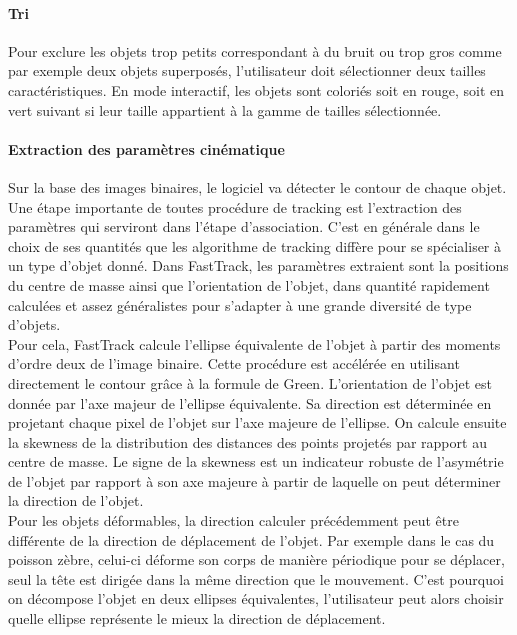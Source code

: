 		
		\paragraph{Tri}
		Pour exclure les objets trop petits correspondant à du bruit ou trop gros comme par exemple deux objets superposés, l’utilisateur doit sélectionner deux tailles caractéristiques. En mode interactif, les objets sont coloriés soit en rouge, soit en vert suivant si leur taille appartient à la gamme de tailles sélectionnée.
		
		\paragraph{Extraction des paramètres cinématique}
		Sur la base des images binaires, le logiciel va détecter le contour de chaque objet. Une étape importante de toutes procédure de tracking est l'extraction des paramètres qui serviront dans l'étape d'association. C'est en générale dans le choix de ses quantités que les algorithme de tracking diffère pour se spécialiser à un type d'objet donné. Dans FastTrack, les paramètres extraient sont la positions du centre de masse ainsi que l'orientation de l’objet, dans quantité rapidement calculées et assez généralistes pour s'adapter à une grande diversité de type d'objets.\\
		
		Pour cela, FastTrack calcule l'ellipse équivalente de l'objet à partir des moments d'ordre deux de l'image binaire. Cette procédure est accélérée en utilisant directement le contour grâce à la formule de Green. L'orientation de l'objet est donnée par l'axe majeur de l'ellipse équivalente. Sa direction est déterminée en projetant chaque pixel de l'objet sur l'axe majeure de l'ellipse. On calcule ensuite la skewness de la distribution des distances des points projetés par rapport au centre de masse. Le signe de la skewness est un indicateur robuste de l’asymétrie de l'objet par rapport à son axe majeure à partir de laquelle on peut déterminer la direction de l'objet.\\
		
		Pour les objets déformables, la direction calculer précédemment peut être différente de la direction de déplacement de l'objet. Par exemple dans le cas du poisson zèbre, celui-ci déforme son corps de manière périodique pour se déplacer, seul la tête est dirigée dans la même direction que le mouvement. C'est pourquoi on décompose l'objet en deux ellipses équivalentes, l'utilisateur peut alors choisir quelle ellipse représente le mieux la direction de déplacement.
		
